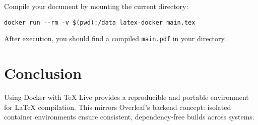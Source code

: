 Compile your document by mounting the current directory:

\begin{verbatim}
docker run --rm -v $(pwd):/data latex-docker main.tex
\end{verbatim}

After execution, you should find a compiled \texttt{main.pdf} in your directory.

\section{Conclusion}

Using Docker with TeX Live provides a reproducible and portable environment for \LaTeX{} compilation. This mirrors Overleaf's backend concept: isolated container environments ensure consistent, dependency-free builds across systems.
